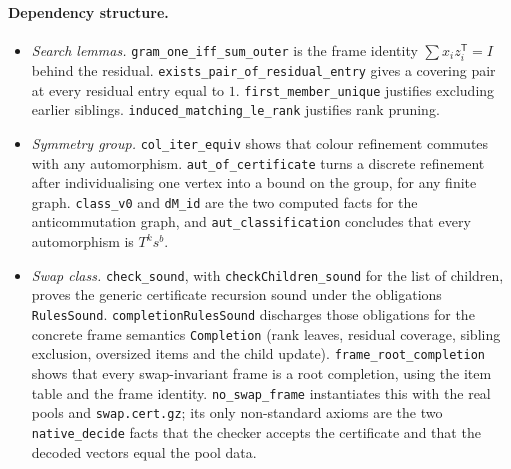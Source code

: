 \documentclass[11pt]{article}
\theoremstyle{definition}
\theoremstyle{remark}
\begin{document}
\paragraph{Dependency structure.}
\begin{itemize}[nosep]
\item \emph{Search lemmas.} \texttt{gram\_one\_iff\_sum\_outer} is the frame identity $\sum x_iz_i^{\mathsf T}=I$ behind the residual. \texttt{exists\_pair\_of\_residual\_entry} gives a covering pair at every residual entry equal to $1$. \texttt{first\_member\_unique} justifies excluding earlier siblings. \texttt{induced\_matching\_le\_rank} justifies rank pruning.
\item \emph{Symmetry group.} \texttt{col\_iter\_equiv} shows that colour refinement commutes with any automorphism. \texttt{aut\_of\_certificate} turns a discrete refinement after individualising one vertex into a bound on the group, for any finite graph. \texttt{class\_v0} and \texttt{dM\_id} are the two computed facts for the anticommutation graph, and \texttt{aut\_classification} concludes that every automorphism is $T^ks^b$.
\item \emph{Swap class.} \texttt{check\_sound}, with \texttt{checkChildren\_sound} for the list of children, proves the generic certificate recursion sound under the obligations \texttt{RulesSound}. \texttt{completionRulesSound} discharges those obligations for the concrete frame semantics \texttt{Completion} (rank leaves, residual coverage, sibling exclusion, oversized items and the child update). \texttt{frame\_root\_completion} shows that every swap-invariant frame is a root completion, using the item table and the frame identity. \texttt{no\_swap\_frame} instantiates this with the real pools and \texttt{swap.cert.gz}; its only non-standard axioms are the two \texttt{native\_decide} facts that the checker accepts the certificate and that the decoded vectors equal the pool data.
\end{itemize}


\end{document}
